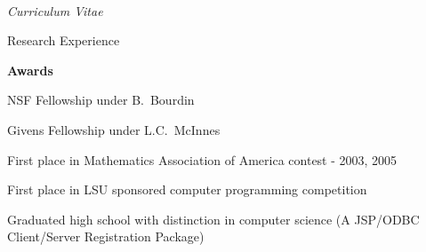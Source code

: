 \documentclass[10pt]{article}
\newenvironment{subbulletlist}{%
	\begin{list}{\labelitemii}{%
		\setlength{\topsep}{\itemsep}\setlength{\parskip}{\parsep}%
	}%
}%
{ \end{list} }
\begin{document}
\begin{cv}{\name\\{\large \itshape Curriculum Vitae}}
\begin{cvlist}{Research Experience}
	\item \textbf{Awards}
	\begin{subbulletlist}
		\item NSF Fellowship under B.~Bourdin
		\item Givens Fellowship under L.C.~McInnes
		\item First place in Mathematics Association of America contest - 2003, 2005
		\item First place in LSU sponsored computer programming competition
		\item Graduated high school with distinction in computer science (A JSP/ODBC Client/Server Registration Package)

\end{subbulletlist}
\end{cvlist}
\end{cv}
\end{document}
